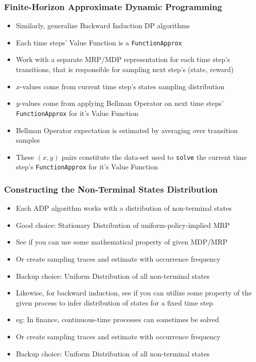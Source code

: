 \documentclass{beamer}
\begin{document}
\begin{frame}
\frametitle{Finite-Horizon Approximate Dynamic Programming}
\pause
\begin{itemize}[<+->]
\item Similarly, generalize Backward Induction DP algorithms
\item Each time steps' Value Function is a \lstinline{FunctionApprox}
\item Work with a separate MRP/MDP representation for each time step's transitions, that is responsible for sampling next step's (state, reward)
\item $x$-values come from current time step's states sampling distribution
\item $y$-values come from applying Bellman Operator on next time steps' \lstinline{FunctionApprox} for it's Value Function
\item  Bellman Operator expectation is estimated by averaging over transition samples
\item These $(x,y)$ pairs constitute the data-set used to \lstinline{solve} the current time step's \lstinline{FunctionApprox} for it's Value Function
\end{itemize}
\end{frame}

\begin{frame}
\frametitle{Constructing the Non-Terminal States Distribution}
\pause
\begin{itemize}[<+->]
\item Each ADP algorithm works with a distribution of non-terminal states
\item Good choice: Stationary Distribution of uniform-policy-implied MRP
\item See if you can use some mathematical property of given MDP/MRP
\item Or create sampling traces and estimate with occurrence frequency
\item Backup choice: Uniform Distribution of all non-terminal states
\item Likewise, for backward induction, see if you can utilize some property of the given process to infer distribution of states for a fixed time step
\item eg: In finance, continuous-time processes can sometimes be solved
\item Or create sampling traces and estimate with occurrence frequency
\item Backup choice: Uniform Distribution of all non-terminal states
\end{itemize}
\end{frame}
\end{document}
